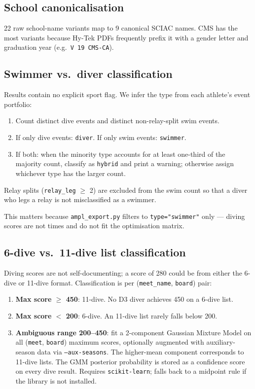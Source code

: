 \documentclass{article}
\begin{document}
\subsection{School canonicalisation}

22 raw school-name variants map to 9 canonical SCIAC names. CMS has the most
variants because Hy-Tek PDFs frequently prefix it with a gender letter and
graduation year (e.g.\ \texttt{V 19 CMS-CA}).

\subsection{Swimmer vs.\ diver classification}

Results contain no explicit sport flag. We infer the type from each athlete's
event portfolio:

\begin{enumerate}[noitemsep]
  \item Count distinct dive events and distinct non-relay-split swim events.
  \item If only dive events: \texttt{diver}. If only swim events:
        \texttt{swimmer}.
  \item If both: when the minority type accounts for at least one-third of
        the majority count, classify as \texttt{hybrid} and print a warning;
        otherwise assign whichever type has the larger count.
\end{enumerate}

Relay splits (\texttt{relay\_leg} $\geq$ 2) are excluded from the swim count
so that a diver who legs a relay is not misclassified as a swimmer.

This matters because \texttt{ampl\_export.py} filters to \texttt{type="swimmer"}
only --- diving scores are not times and do not fit the optimisation matrix.

\subsection{6-dive vs.\ 11-dive list classification}

Diving scores are not self-documenting; a score of 280 could be from either
the 6-dive or 11-dive format. Classification is per (\texttt{meet\_name},
\texttt{board}) pair:

\begin{enumerate}[noitemsep]
  \item \textbf{Max score $\geq$ 450}: 11-dive. No D3 diver achieves 450 on
        a 6-dive list.
  \item \textbf{Max score $<$ 200}: 6-dive. An 11-dive list rarely falls
        below 200.
  \item \textbf{Ambiguous range 200--450}: fit a 2-component Gaussian Mixture
        Model on all (\texttt{meet}, \texttt{board}) maximum scores,
        optionally augmented with auxiliary-season data via
        \texttt{--aux-seasons}. The higher-mean component corresponds to
        11-dive lists. The GMM posterior probability is stored as a confidence
        score on every dive result. Requires \texttt{scikit-learn}; falls back
        to a midpoint rule if the library is not installed.
\end{enumerate}
\end{document}
